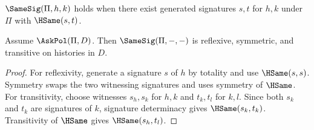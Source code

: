 \begin{definition}
\(\SameSig(\Pi,h,k)\) holds when there exist generated signatures \(s,t\) for \(h,k\) under \(\Pi\) with \(\HSame(s,t)\).
\end{definition}

\begin{theorem}
\label{thm:signature-sameness-equivalence-proof-standing}
Assume \(\AskPol(\Pi,D)\). Then \(\SameSig(\Pi,-,-)\) is reflexive, symmetric, and transitive on histories in \(D\).
\end{theorem}
\begin{proof}
For reflexivity, generate a signature \(s\) of \(h\) by totality and use \(\HSame(s,s)\). Symmetry swaps the two witnessing signatures and uses symmetry of \(\HSame\). For transitivity, choose witnesses \(s_h,s_k\) for \(h,k\) and \(t_k,t_l\) for \(k,l\). Since both \(s_k\) and \(t_k\) are signatures of \(k\), signature determinacy gives \(\HSame(s_k,t_k)\). Transitivity of \(\HSame\) gives \(\HSame(s_h,t_l)\).
\end{proof}
